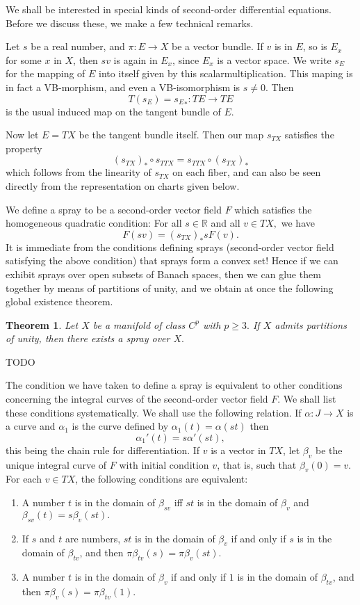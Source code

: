 \documentclass[a5paper,10pt,twoside]{article}
\newcommand{\R}{\ensuremath{\mathbb{R}}}
\theoremstyle{plain}
\newtheorem{teo}{Theorem}[section]
\theoremstyle{definition}
\theoremstyle{remark}
\begin{document}
We shall be interested in special kinds of second-order differential equations. Before we discuss these, we make a few technical remarks.

Let $s$ be a real number, and $\pi: E\to X$ be a vector bundle. If $v$ is in $E$, so is $E_x$ for some $x$ in $X$, then $sv$ is again in $E_x$, since $E_x$ is a vector space. We write $s_E$ for the mapping of $E$ into itself given by this scalarmultiplication. This maping is in fact a VB-morphism, and even a VB-isomorphism is $s\neq 0$. Then
$$
T(s_E)={s_E}_* : TE\to TE
$$
is the usual induced map on the tangent bundle of $E$.

Now let $E = TX$ be the tangent bundle itself. Then our map $s_{TX}$ satisfies the property
$$
(s_{TX})_*\circ s_{TTX} = s_{TTX}\circ (s_{TX})_*
$$
which follows from the linearity of $s_{TX}$ on each fiber, and can also be seen directly  from the representation on charts given below.

We define a spray to be a second-order vector field $F$ which satisfies the homogeneous quadratic condition: For all $s\in\R$ and all $v\in TX,$ we have
$$
F(sv)=(s_{TX})_* sF(v).
$$
It is immediate from the conditions defining sprays (second-order vector field satisfying the above condition) that sprays form a convex set! Hence if we can exhibit sprays over open subsets of Banach spaces, then we can glue them together by means of partitions of unity, and we obtain at once the following global existence theorem.

\begin{teo}
Let $X$ be a manifold of class $C^{p}$ with $p\geq 3.$ If $X$ admits partitions of unity, then there exists a spray over $X.$
\end{teo}


TODO

The condition we have taken to define a spray is equivalent to other conditions concerning the integral curves of the second-order vector field $F.$ We shall list these conditions systematically. We shall use the following relation. If $\alpha:J\to X$ is a curve and $\alpha_1$ is the curve defined by $\alpha_1(t)=\alpha(st)$ then
$$
\alpha_1'(t)=s\alpha'(st),
$$
this being the chain rule for differentiation.
If $v$ is a vector in $TX$, let $\beta_v$ be the unique integral curve of $F$ with initial condition $v$, that is, such that $\beta_v(0)=v.$ For each $v\in TX$, the following conditions are equivalent:
%
\begin{enumerate}
	\item A number $t$ is in the domain of $\beta_{sv}$ iff $st$ is in the domain of $\beta_v$ and $\beta_{sv}(t)=s\beta_v(st).$
	\item If $s$ and $t$ are numbers, $st$ is in the domain of $\beta_v$ if and only if $s$ is in 	the domain of $\beta_{tv}$, and then $\pi\beta_{tv}(s)=\pi\beta_v(st).$
	\item A number $t$ is in the domain of $\beta_v$ if and only if $1$ is in the
	domain of $\beta_{tv}$, and then  $\pi\beta_{v}(s)=\pi\beta_{tv}(1).$
\end{enumerate}
\end{document}
